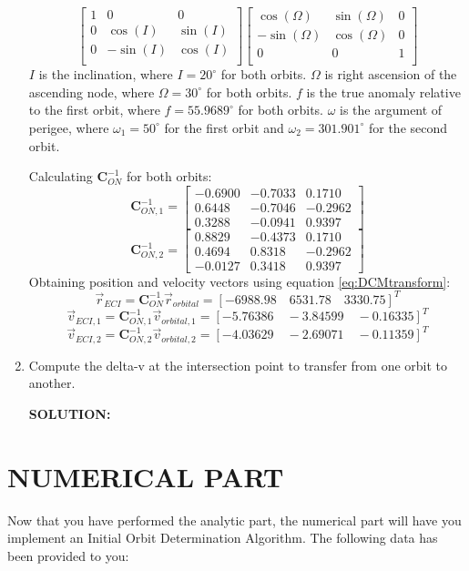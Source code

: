 \documentclass[12pt, letterpaper]{aiaa-tc}
\begin{document}
\begin{enumerate}
\[\begin{bmatrix}
        1 & 0 & 0 \\
        0 & \cos(I) & \sin(I) \\
        0 & -\sin(I) & \cos(I) \\
    \end{bmatrix}
    \begin{bmatrix}
        \cos(\Omega) & \sin(\Omega) & 0 \\
        -\sin(\Omega) & \cos(\Omega) & 0 \\
        0 & 0 & 1 \\
    \end{bmatrix} \]
    $I$ is the inclination, where $I=20^{\circ}$ for both orbits.
    $\Omega$ is right ascension of the ascending node, where $\Omega=30^{\circ}$ for both orbits.
    $f$ is the true anomaly relative to the first orbit, where $f=55.9689^{\circ}$ for both orbits.
    $\omega$ is the argument of perigee, where $\omega_1=50^{\circ}$ for the first orbit and 
    $\omega_2=301.901^{\circ}$ for the second orbit.

    Calculating $\bm{C}^{-1}_{ON}$ for both orbits:
    \[ \bm{C}^{-1}_{ON,1}=
    \begin{bmatrix}
        -0.6900 & -0.7033 & 0.1710\\ 0.6448 & -0.7046 & -0.2962\\ 0.3288 & -0.0941 & 0.9397
    \end{bmatrix}\]
    \[ \bm{C}^{-1}_{ON,2}=
    \begin{bmatrix}
        0.8829 & -0.4373 & 0.1710\\ 0.4694 & 0.8318 & -0.2962\\ -0.0127 & 0.3418 & 0.9397
    \end{bmatrix}\]
    Obtaining position and velocity vectors using equation \eqref{eq:DCMtransform}:
    \[ \vec{r}_{ECI}=\bm{C}^{-1}_{ON}\vec{r}_{orbital}=[-6988.98\quad 6531.78\quad 3330.75]^T \]
    \[ \vec{v}_{ECI,1}=\bm{C}^{-1}_{ON,1}\vec{v}_{orbital,1}=[ -5.76386\quad -3.84599\quad -0.16335]^T \]
    \[ \vec{v}_{ECI,2}=\bm{C}^{-1}_{ON,2}\vec{v}_{orbital,2}=[-4.03629\quad -2.69071\quad -0.11359]^T \]



    \item Compute the delta-v at the intersection point to transfer from one orbit to another.
    
    \textbf{SOLUTION:}

\end{enumerate}

\section{NUMERICAL PART}
Now that you have performed the analytic part, the numerical part will have you implement an Initial Orbit
Determination Algorithm. The following data has been provided to you:
\end{document}
